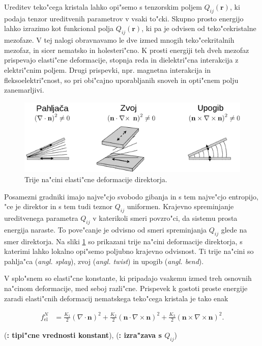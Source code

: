 \documentclass[a4paper,10pt]{article}
\newcommand{\todo}[1]{(\textbf{\textsmaller{TODO}: #1})}
\renewcommand{\vec}{\mathbf}
\newcommand{\angl}[1]{(\textit{angl. #1})}
\begin{document}
Ureditev teko"cega kristala lahko opi"semo s tenzorskim poljem $Q_{ij}(\vec r)$, ki podaja tenzor ureditvenih parametrov v vsaki to"cki. 
Skupno prosto energijo lahko izrazimo kot funkcional polja $Q_{ij}(\vec r)$, ki pa je odvisen od teko"cekristalne mezofaze. 
V tej nalogi obravnavamo le dve izmed mnogih teko"cekritalnih mezofaz, in sicer nematsko in holesteri"cno. 
K prosti energiji teh dveh mezofaz prispevajo elasti"cne deformacije, stopnja reda in dielektri"cna interakcija z elektri"cnim poljem. 
Drugi prispevki, npr. magnetna interakcija in fleksoelektri"cnost, so pri obi"cajno uporabljanih snoveh in opti"cnem polju zanemarljivi.

\begin{figure}[h]
\begin{center}
  \includegraphics[width=.7\textwidth]{./Slike/tsb_slo}
  \caption{Trije na"cini elasti"cne deformacije direktorja. }
\label{fig:tsb}
\end{center}
\end{figure}
Posamezni gradniki imajo najve"cjo svobodo gibanja in s tem najve"cjo entropijo, "ce je direktor in s tem tudi teznor $Q_{ij}$ uniformen. 
Krajevno spreminjanje ureditvenega parametra $Q_{ij}$ v katerikoli smeri povzro"ci, da sistemu prosta energija naraste. 
To pove"canje je odvisno od smeri spreminjanja $Q_{ij}$ glede na smer direktorja. 
Na sliki \ref{fig:tsb} so prikazani trije na"cini deformacije direktorja, s katerimi lahko lokalno opi"semo poljubno krajevno odvisnost. 
Ti trije na"cini so pahlja"ca \angl{splay}, zvoj \angl{twist} in upogib \angl{bend}. 

V splo"snem so elasti"cne konstante, ki pripadajo vsakemu izmed treh osnovnih na"cinom deformacije, med seboj razli"cne. 
Prispevek k gostoti proste energije zaradi elasti"cnih deformacij nematskega teko"cega kristala je tako enak

\begin{align}
 f_{\mathrm{el}}^N &= \frac{K_1}{2} (\nabla \cdot \vec n)^2 + \frac{K_2}{2} (\vec n \cdot \nabla \times \vec n)^2 + \frac{K_3}{2} (\vec n \times \nabla \times \vec n)^2. 
\end{align}

\todo{tipi"cne vrednosti konstant}, \todo{izra"zava s $Q_{ij}$}
\end{document}
